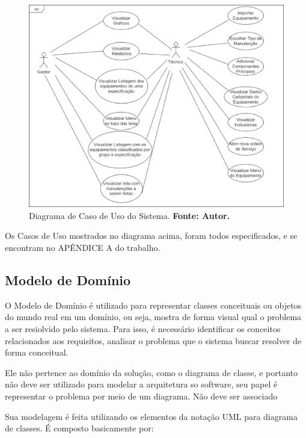 \graphicspath{{figuras/}}
\begin{figure}[H]
\centering
\includegraphics[width=1.0\textwidth]{diagrama-de-caso-de-uso}
\caption{Diagrama de Caso de Uso do Sistema. \textbf{Fonte: Autor.}}
\label{diagrama-de-caso-de-uso}
\end{figure}

Os Casos de Uso mostrados no diagrama acima, foram todos especificados, e se encontram no APÊNDICE A do trabalho.


\subsection{Modelo de Domínio}

O Modelo de Domínio é utilizado para representar classes conceituais ou objetos do mundo real em um domínio, ou seja, mostra de forma visual qual o problema a ser resiolvido pelo sistema. Para isso, é necessário identificar os conceitos relacionados aos requisitos, analisar o problema que o sistema buscar resolver de forma conceitual.

Ele não pertence ao domínio da solução, como o diagrama de classe, e portanto não deve ser utilizado para modelar a arquitetura so software, seu papel é representar o problema por meio de um diagrama. Não deve ser associado

Sua modelagem é feita utilizando os elementos da notação UML para diagrama de classes. É composto basicamente por:

